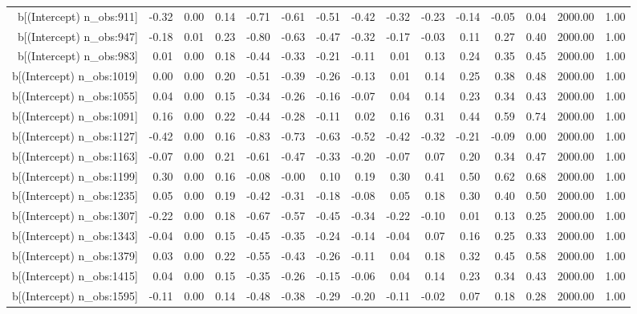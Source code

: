 \begin{table}[ht]
\begin{tabular}{rrrrrrrrrrrrrrr}
  b[(Intercept) n\_obs:911] & -0.32 & 0.00 & 0.14 & -0.71 & -0.61 & -0.51 & -0.42 & -0.32 & -0.23 & -0.14 & -0.05 & 0.04 & 2000.00 & 1.00 \\ 
  b[(Intercept) n\_obs:947] & -0.18 & 0.01 & 0.23 & -0.80 & -0.63 & -0.47 & -0.32 & -0.17 & -0.03 & 0.11 & 0.27 & 0.40 & 2000.00 & 1.00 \\ 
  b[(Intercept) n\_obs:983] & 0.01 & 0.00 & 0.18 & -0.44 & -0.33 & -0.21 & -0.11 & 0.01 & 0.13 & 0.24 & 0.35 & 0.45 & 2000.00 & 1.00 \\ 
  b[(Intercept) n\_obs:1019] & 0.00 & 0.00 & 0.20 & -0.51 & -0.39 & -0.26 & -0.13 & 0.01 & 0.14 & 0.25 & 0.38 & 0.48 & 2000.00 & 1.00 \\ 
  b[(Intercept) n\_obs:1055] & 0.04 & 0.00 & 0.15 & -0.34 & -0.26 & -0.16 & -0.07 & 0.04 & 0.14 & 0.23 & 0.34 & 0.43 & 2000.00 & 1.00 \\ 
  b[(Intercept) n\_obs:1091] & 0.16 & 0.00 & 0.22 & -0.44 & -0.28 & -0.11 & 0.02 & 0.16 & 0.31 & 0.44 & 0.59 & 0.74 & 2000.00 & 1.00 \\ 
  b[(Intercept) n\_obs:1127] & -0.42 & 0.00 & 0.16 & -0.83 & -0.73 & -0.63 & -0.52 & -0.42 & -0.32 & -0.21 & -0.09 & 0.00 & 2000.00 & 1.00 \\ 
  b[(Intercept) n\_obs:1163] & -0.07 & 0.00 & 0.21 & -0.61 & -0.47 & -0.33 & -0.20 & -0.07 & 0.07 & 0.20 & 0.34 & 0.47 & 2000.00 & 1.00 \\ 
  b[(Intercept) n\_obs:1199] & 0.30 & 0.00 & 0.16 & -0.08 & -0.00 & 0.10 & 0.19 & 0.30 & 0.41 & 0.50 & 0.62 & 0.68 & 2000.00 & 1.00 \\ 
  b[(Intercept) n\_obs:1235] & 0.05 & 0.00 & 0.19 & -0.42 & -0.31 & -0.18 & -0.08 & 0.05 & 0.18 & 0.30 & 0.40 & 0.50 & 2000.00 & 1.00 \\ 
  b[(Intercept) n\_obs:1307] & -0.22 & 0.00 & 0.18 & -0.67 & -0.57 & -0.45 & -0.34 & -0.22 & -0.10 & 0.01 & 0.13 & 0.25 & 2000.00 & 1.00 \\ 
  b[(Intercept) n\_obs:1343] & -0.04 & 0.00 & 0.15 & -0.45 & -0.35 & -0.24 & -0.14 & -0.04 & 0.07 & 0.16 & 0.25 & 0.33 & 2000.00 & 1.00 \\ 
  b[(Intercept) n\_obs:1379] & 0.03 & 0.00 & 0.22 & -0.55 & -0.43 & -0.26 & -0.11 & 0.04 & 0.18 & 0.32 & 0.45 & 0.58 & 2000.00 & 1.00 \\ 
  b[(Intercept) n\_obs:1415] & 0.04 & 0.00 & 0.15 & -0.35 & -0.26 & -0.15 & -0.06 & 0.04 & 0.14 & 0.23 & 0.34 & 0.43 & 2000.00 & 1.00 \\ 
  b[(Intercept) n\_obs:1595] & -0.11 & 0.00 & 0.14 & -0.48 & -0.38 & -0.29 & -0.20 & -0.11 & -0.02 & 0.07 & 0.18 & 0.28 & 2000.00 & 1.00 \\ 

\end{tabular}
\end{table}

